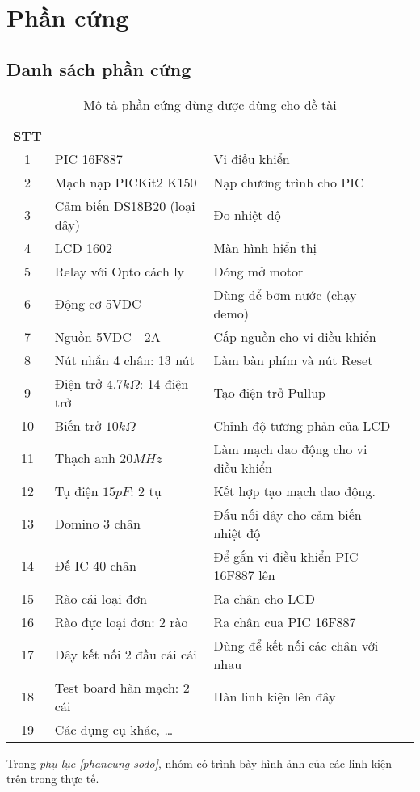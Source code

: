 \chapter{Phần cứng}
\section{Danh sách phần cứng}
\begin{table}[!h]
\begin{center}
\begin{tabular}{|c|p{6cm}|p{7.5cm}|l}\cline{1-3}
\textbf{STT} & \centering{\textbf{Phần cứng}} & \centering{\textbf{Mô tả}} & \\ \cline{1-3}
1 & PIC 16F887 & Vi điều khiển & \\ \cline{1-3}
2 & Mạch nạp PICKit2 K150 & Nạp chương trình cho PIC & \\ \cline{1-3}
3 & Cảm biến DS18B20 (loại dây) & Đo nhiệt độ  & \\ \cline{1-3}
4 & LCD 1602 & Màn hình hiển thị   & \\ \cline{1-3}
5 & Relay với Opto cách ly & Đóng mở motor & \\ \cline{1-3}
6 & Động cơ 5VDC & Dùng để bơm nước (chạy demo)  & \\ \cline{1-3}
7 & Nguồn 5VDC - 2A & Cấp nguồn cho vi điều khiển & \\ \cline{1-3}
8 & Nút nhấn 4 chân: 13 nút & Làm bàn phím và nút Reset  & \\ \cline{1-3}
9 & Điện trở $4.7k\Omega$: 14 điện trở & Tạo điện trở Pullup  & \\ \cline{1-3}
10 & Biến trở $10k\Omega$ & Chỉnh độ tương phản của LCD  & \\ \cline{1-3}
11 & Thạch anh $20MHz$ & Làm mạch dao động cho vi điều khiển  & \\ \cline{1-3}
12 & Tụ điện $15pF$: 2 tụ & Kết hợp tạo mạch dao động. & \\ \cline{1-3}
13 & Domino 3 chân & Đấu nối dây cho cảm biến nhiệt độ  & \\ \cline{1-3}
14 & Đế IC 40 chân & Để gắn vi điều khiển PIC 16F887 lên  & \\ \cline{1-3}
15 & Rào cái loại đơn & Ra chân cho LCD  & \\ \cline{1-3}
16 & Rào đực loại đơn: 2 rào & Ra chân cua PIC 16F887  & \\ \cline{1-3}
17 & Dây kết nối 2 đầu cái cái & Dùng để kết nối các chân với nhau  & \\ \cline{1-3}
18 & Test board hàn mạch: 2 cái & Hàn linh kiện lên đây  & \\ \cline{1-3}
19 & Các dụng cụ khác, \ldots &  & \\ \cline{1-3}
\end{tabular}
\end{center}
\caption{Mô tả phần cứng dùng được dùng cho đề tài}
\end{table}
Trong \textit{phụ lục \ref{phancung-sodo}}, nhóm có trình bày hình ảnh của các linh kiện trên trong thực tế.
\newpage
